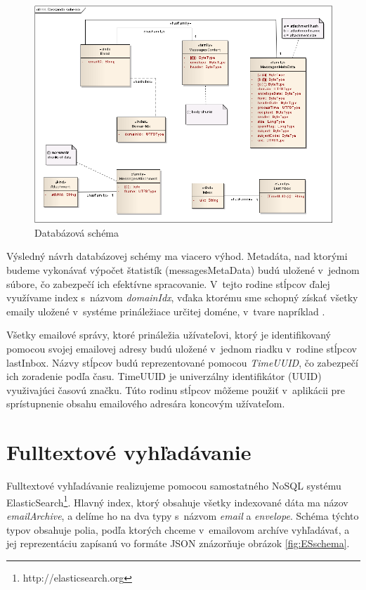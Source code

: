 \documentclass[11pt,twoside,a4paper]{book}
\begin{document}
\begin{figure}[h]
 \centering
 \includegraphics[width=17cm]{./figures/cassandra.png}
 \caption{Databázová schéma}
 \label{fig:Cschema}
\end{figure}

Výsledný návrh databázovej schémy ma viacero výhod. Metadáta, nad ktorými budeme vykonávať výpočet štatistík (messagesMetaData) budú uložené v~jednom súbore, čo zabezpečí ich efektívne spracovanie. V~tejto rodine stĺpcov ďalej využívame index s~názvom \emph{domainIdx}, vďaka ktorému sme schopný získať všetky emaily uložené v~systéme prináležiace určitej doméne, v~tvare napríklad . 

Všetky emailové správy, ktoré prináležia užívateľovi, ktorý je identifikovaný pomocou svojej emailovej adresy budú uložené v~jednom riadku v~rodine stĺpcov lastInbox. Názvy stĺpcov budú reprezentované pomocou \emph{TimeUUID}, čo zabezpečí ich zoradenie podľa času. TimeUUID je univerzálny identifikátor (UUID) využivajúci časovú značku. Túto rodinu stĺpcov môžeme použiť v~aplikácii pre sprístupnenie obsahu emailového adresára koncovým užívateľom.





\section{Fulltextové vyhľadávanie}

Fulltextové vyhľadávanie realizujeme pomocou samostatného NoSQL systému ElasticSearch\footnote{http://elasticsearch.org}.  Hlavný index, ktorý obsahuje všetky indexované dáta ma názov \emph{emailArchive}, a delíme ho na dva typy s~názvom \emph{email} a \emph{envelope}. Schéma týchto typov obsahuje polia, podľa ktorých chceme v~emailovom archíve vyhľadávať, a jej reprezentáciu zapísanú vo formáte JSON znázorňuje obrázok \ref{fig:ESschema}.
\end{document}
